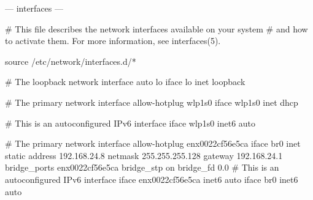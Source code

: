 \documentclass[mingoth,a4paper]{jsarticle}
\begin{document}
--- interfaces ---
\begin{commandline}
# This file describes the network interfaces available on your system
# and how to activate them. For more information, see interfaces(5).

source /etc/network/interfaces.d/*

# The loopback network interface
auto lo
iface lo inet loopback

# The primary network interface
allow-hotplug wlp1s0
iface  wlp1s0 inet dhcp

# This is an autoconfigured IPv6 interface
iface wlp1s0 inet6 auto

# The primary network interface
allow-hotplug enx0022cf56e5ca
iface br0 inet static
   address 192.168.24.8
   netmask 255.255.255.128
   gateway 192.168.24.1
   bridge_ports enx0022cf56e5ca
   bridge_stp on
   bridge_fd 0.0
# This is an autoconfigured IPv6 interface
iface enx0022cf56e5ca inet6 auto
iface br0 inet6 auto
\end{commandline}
\clearpage
\end{document}
